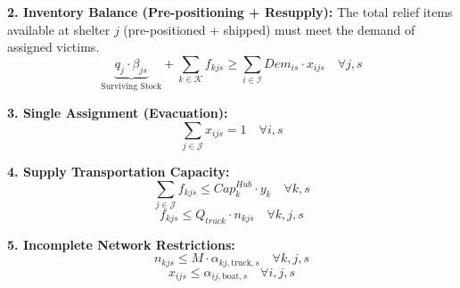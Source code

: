 \noindent \textbf{2. Inventory Balance (Pre-positioning + Resupply):}
The total relief items available at shelter $j$ (pre-positioned + shipped) must meet the demand of assigned victims.
\begin{equation}
    \underbrace{q_j \cdot \beta_{js}}_{\text{Surviving Stock}} + \sum_{k \in \mathcal{K}} f_{kjs} \ge \sum_{i \in \mathcal{I}} Dem_{is} \cdot x_{ijs} \quad \forall j, s
\end{equation}

\noindent \textbf{3. Single Assignment (Evacuation):}
\begin{equation}
    \sum_{j \in \mathcal{J}} x_{ijs} = 1 \quad \forall i, s
\end{equation}

\noindent \textbf{4. Supply Transportation Capacity:}
\begin{equation}
    \sum_{j \in \mathcal{J}} f_{kjs} \le Cap_k^{Hub} \cdot y_k \quad \forall k, s
\end{equation}
\begin{equation}
    f_{kjs} \le Q_{truck} \cdot n_{kjs} \quad \forall k, j, s
\end{equation}

\noindent \textbf{5. Incomplete Network Restrictions:}
\begin{equation}
    n_{kjs} \le M \cdot \alpha_{kj, \text{truck}, s} \quad \forall k, j, s
\end{equation}
\begin{equation}
    x_{ijs} \le \alpha_{ij, \text{boat}, s} \quad \forall i, j, s
\end{equation}

